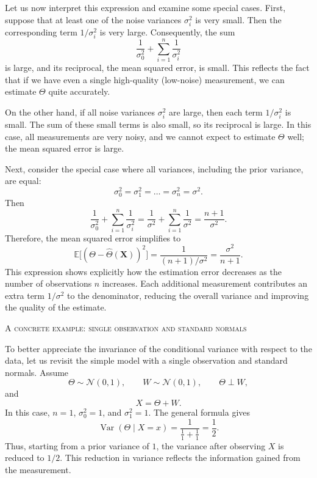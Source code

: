 Let us now interpret this expression and examine some special cases.  
First, suppose that at least one of the noise variances \(\sigma_{i}^{2}\) is very small.  
Then the corresponding term \(1/\sigma_{i}^{2}\) is very large.  
Consequently, the sum
\[
\frac{1}{\sigma_{0}^{2}} + \sum_{i=1}^{n}\frac{1}{\sigma_{i}^{2}}
\]
is large, and its reciprocal, the mean squared error, is small.  
This reflects the fact that if we have even a single high-quality (low-noise) measurement, we can estimate \(\Theta\) quite accurately.

On the other hand, if all noise variances \(\sigma_{i}^{2}\) are large, then each term \(1/\sigma_{i}^{2}\) is small.  
The sum of these small terms is also small, so its reciprocal is large.  
In this case, all measurements are very noisy, and we cannot expect to estimate \(\Theta\) well; the mean squared error is large.

Next, consider the special case where all variances, including the prior variance, are equal:
\[
\sigma_{0}^{2}
=
\sigma_{1}^{2}
=
\dots
=
\sigma_{n}^{2}
=
\sigma^{2}.
\]
Then
\[
\frac{1}{\sigma_{0}^{2}} + \sum_{i=1}^{n}\frac{1}{\sigma_{i}^{2}}
=
\frac{1}{\sigma^{2}} + \sum_{i=1}^{n}\frac{1}{\sigma^{2}}
=
\frac{n+1}{\sigma^{2}}.
\]
Therefore, the mean squared error simplifies to
\[
\mathbb{E}\big[(\Theta - \hat{\Theta}(\mathbf{X}))^{2}\big]
=
\frac{1}{(n+1)/\sigma^{2}}
=
\frac{\sigma^{2}}{n+1}.
\]
This expression shows explicitly how the estimation error decreases as the number of observations \(n\) increases.  
Each additional measurement contributes an extra term \(1/\sigma^{2}\) to the denominator, reducing the overall variance and improving the quality of the estimate.

\bigskip
\textsc{A concrete example: single observation and standard normals}

To better appreciate the invariance of the conditional variance with respect to the data, let us revisit the simple model with a single observation and standard normals.  
Assume
\[
\Theta \sim \mathcal{N}(0,1),
\qquad
W \sim \mathcal{N}(0,1),
\qquad
\Theta \perp W,
\]
and
\[
X
=
\Theta + W.
\]
In this case, \(n=1\), \(\sigma_{0}^{2} = 1\), and \(\sigma_{1}^{2} = 1\).  
The general formula gives
\[
\operatorname{Var}(\Theta \mid X = x)
=
\frac{1}{\displaystyle \frac{1}{1} + \frac{1}{1}}
=
\frac{1}{2}.
\]
Thus, starting from a prior variance of \(1\), the variance after observing \(X\) is reduced to \(1/2\).  
This reduction in variance reflects the information gained from the measurement.

